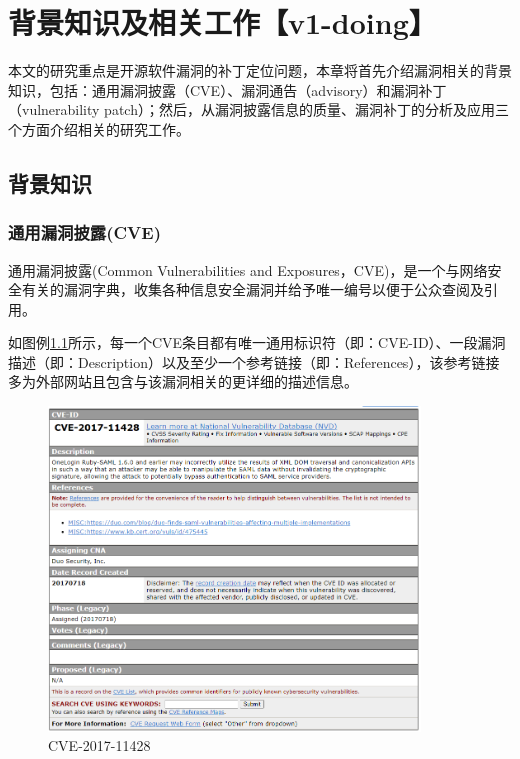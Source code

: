 \chapter{背景知识及相关工作【v1-doing】}
本文的研究重点是开源软件漏洞的补丁定位问题，本章将首先介绍漏洞相关的背景知识，包括：通用漏洞披露（CVE）、漏洞通告（advisory）和漏洞补丁（vulnerability patch）；然后，从漏洞披露信息的质量、漏洞补丁的分析及应用三个方面介绍相关的研究工作。


\section{背景知识}

\subsection{通用漏洞披露(CVE)} 
通用漏洞披露(Common Vulnerabilities and Exposures，CVE)\cite{mitre2021:cve}，是一个与网络安全有关的漏洞字典，收集各种信息安全漏洞并给予唯一编号以便于公众查阅及引用。

如图例\ref{fig:CVE-2017-11428}所示，每一个CVE条目都有唯一通用标识符（即：CVE-ID）、一段漏洞描述（即：Description）以及至少一个参考链接（即：References），该参考链接多为外部网站且包含与该漏洞相关的更详细的描述信息。

\begin{figure}[h]
    \centering
    \includegraphics[width=0.88\textwidth]{res/CVE-2017-11428.png}
    \caption{CVE-2017-11428}
    \label{fig:CVE-2017-11428}
\end{figure}

